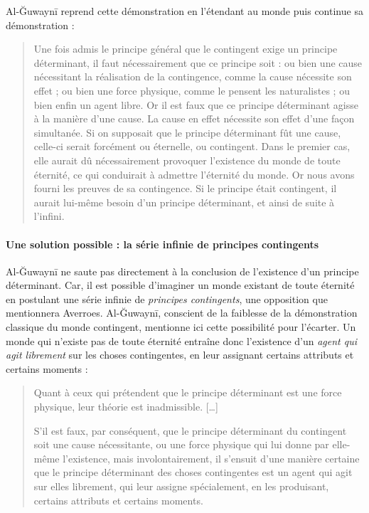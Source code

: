 Al-Ğuwaynī reprend cette démonstration en l'étendant au monde puis continue sa démonstration : 

\begin{quote}
Une fois admis le principe général que le contingent exige un principe
déterminant, il faut nécessairement que ce principe soit : ou bien une
cause nécessitant la réalisation de la contingence, comme la cause
nécessite son effet ; ou bien une force physique, comme le pensent les
naturalistes ; ou bien enfin un agent libre. Or il est faux que ce
principe déterminant agisse à la manière d'une cause. La cause en effet
nécessite son effet d'une façon simultanée. Si on supposait que le
principe déterminant fût une cause, celle-ci serait forcément ou
éternelle, ou contingent. Dans le premier cas, elle aurait dû
nécessairement provoquer l'existence du monde de toute éternité, ce qui
conduirait à admettre l'éternité du monde. Or nous avons fourni les
preuves de sa contingence. Si le principe était contingent, il aurait
lui-même besoin d'un principe déterminant, et ainsi de suite à l'infini.
    
\end{quote}


 \paragraph{Une solution possible : la série infinie de principes contingents} Al-Ğuwaynī ne saute pas directement à la conclusion de l'existence d'un principe déterminant. Car, il est possible d'imaginer un monde existant de toute éternité en postulant une série infinie de \textit{principes contingents}, une opposition que mentionnera Averroes. Al-Ğuwaynī, conscient de la faiblesse de la démonstration classique du monde contingent, mentionne ici cette possibilité pour l'écarter.
Un monde qui n'existe pas de toute éternité entraîne donc l'existence d'un \textit{agent qui agit librement} sur les choses contingentes, en leur assignant certains attributs et certains moments :

\begin{quote}
Quant à ceux qui prétendent que le principe déterminant est une force
physique, leur théorie
est inadmissible. {[}\ldots{]}

S'il est faux, par conséquent, que le principe déterminant du contingent
soit une cause nécessitante, ou une force physique qui lui donne par
elle-même l'existence, mais involontairement, il s'ensuit d'une manière
certaine que le principe déterminant des choses
contingentes est un agent qui agit sur elles librement, qui leur assigne
spécialement, en les produisant, certains attributs et certains moments.
\end{quote}
 
